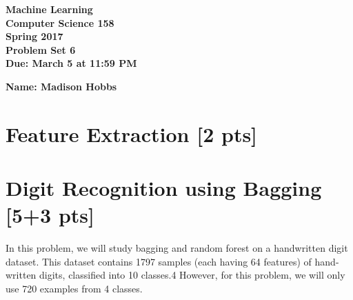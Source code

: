 \documentclass[11pt]{article}
\begin{document}
\newcommand{\Name}[1]{\noindent \textbf{Name:} #1 \\}
\newcommand{\pderiv}[2]{\frac{\partial #1}{\partial #2}}
\newcommand{\psderiv}[3]{\frac{\partial^2 #1}{\partial #2 \partial #3}}

\begin{center}
    \bf
    Machine Learning \\
    Computer Science 158 \\
    Spring 2017 \\
    \rm
    Problem Set 6\\
    Due:  March 5 at 11:59 PM \\
\end{center}
\noindent \textbf{Name: Madison Hobbs} \\


\section{Feature Extraction [2 pts]}

\section{Digit Recognition using Bagging [5+3 pts]}

In this problem, we will study bagging and random forest on a handwritten digit dataset. This dataset contains 1797 samples (each having 64 features) of hand-written digits, classified into 10 classes.4 However, for this problem, we will only use 720 examples from 4 classes.
\end{document}
